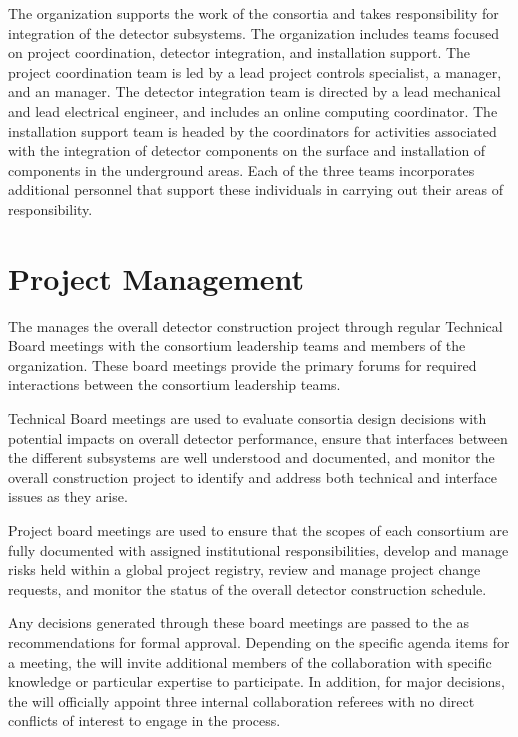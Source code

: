 The  organization supports the work of the consortia and
takes responsibility for integration of the detector
subsystems.  The organization includes teams focused on project
coordination, detector integration, and installation support.  The
project coordination team is led by a lead project controls
specialist, a  manager, and an  manager.  The
detector integration team is directed by a lead mechanical and lead
electrical engineer, and includes an online computing coordinator.
The installation support team is headed by the coordinators for
activities associated with the integration of detector components on
the surface and installation of components in the underground areas.
Each of the three teams incorporates additional personnel that support
these individuals in carrying out their areas of responsibility.

\section{Project Management}
\label{sec:pm}


The  manages the overall detector construction
project through regular Technical Board meetings with the consortium leadership
teams and members of the  organization.  These
board meetings provide the primary forums for required interactions
between the consortium leadership teams.

Technical Board meetings are used to evaluate consortia design
decisions with potential impacts on overall detector performance,
ensure that interfaces between the different subsystems are well
understood and documented, and monitor the overall construction
project to identify and address both technical and interface issues as
they arise.

Project board meetings are used to ensure that the scopes of each
consortium are fully documented with assigned institutional
responsibilities, develop and manage risks held within a global
project registry, review and manage project change requests, and
monitor the status of the overall detector construction schedule.

Any decisions generated through these board meetings are passed to the
  as recommendations for formal approval.
Depending on the specific agenda items %
for a meeting, the  will invite additional members of
the collaboration with specific knowledge or particular expertise to
participate.  In addition, for major decisions, the 
will officially appoint three internal collaboration
referees with no direct conflicts of interest to engage in the
process.

